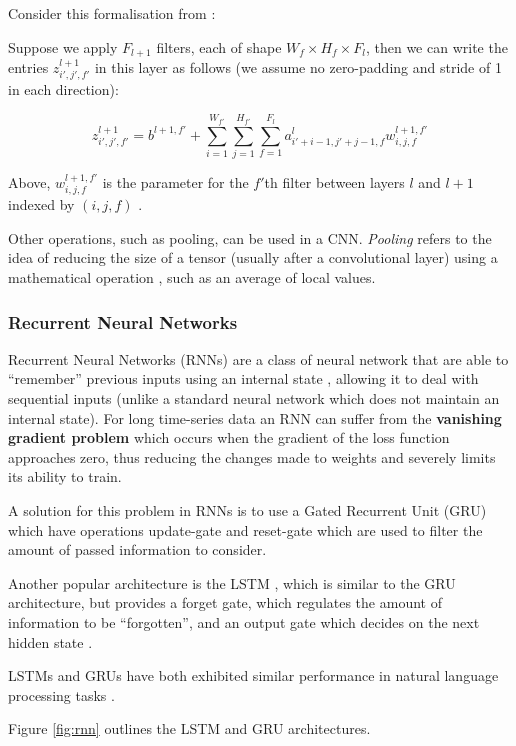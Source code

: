 Consider this formalisation from \cite{csmlnotes}:

Suppose we apply $F_{l+1}$ filters, each of shape $W_f \times H_f \times F_l$, then we can write the entries $z_{i',j',f'}^{l+1}$ in this layer as follows (we assume no zero-padding and stride of 1 in each direction):



 \[z_{i',j',f'}^{l+1} = b^{l+1,f'} + \sum_{i=1}^{W_{f'}}\sum_{j=1}^{H_{f'}}\sum_{f=1}^{F_l}a^l_{i'+i-1,j'+j-1,f} w^{l+1,f'}_{i,j,f}
 \]
 
 Above, $w^{l+1,f'}_{i,j,f}$ is the parameter for the $f'$th filter between layers $l$ and $l+1$ indexed by $(i,j,f)$ \cite{csmlnotes}.
 
 
 
Other operations, such as pooling, can be used in a CNN. \textit{Pooling} refers to the idea of reducing the size of a tensor (usually after a convolutional layer) using a mathematical operation \cite{cnn}, such as an average of local values.

\subsubsection{Recurrent Neural Networks}
Recurrent Neural Networks (RNNs) are a class of neural network that are able to ``remember'' previous inputs using an internal state \cite{rnn}, allowing it to deal with sequential inputs (unlike a standard neural network which does not maintain an internal state). For long time-series data an RNN can suffer from the \textbf{vanishing gradient problem} \cite{rnn} which occurs when the gradient of the loss function approaches zero, thus reducing the changes made to weights and severely limits its ability to train. 

A solution for this problem in RNNs is to use a Gated Recurrent Unit (GRU) \cite{gru} which have operations update-gate and reset-gate which are used to filter the amount of passed information to consider. 

Another popular architecture is the LSTM \cite{lstm}, which is similar to the GRU architecture, but provides a forget gate, which regulates the amount of information to be ``forgotten'', and an output gate which decides on the next hidden state \cite{lstm}.

LSTMs and GRUs have both exhibited similar performance in natural language processing tasks \cite{lstmvsgru}.

Figure \ref{fig:rnn} outlines the LSTM and GRU architectures.

